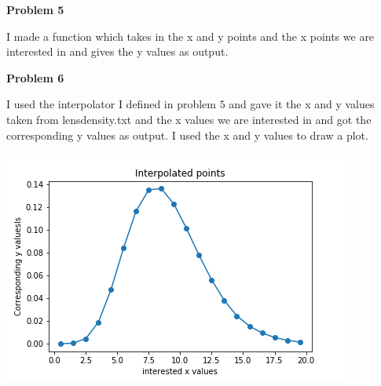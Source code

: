 \documentclass{article}
\begin{document}
\vspace{1.5em}

\textbf{Problem 5}\vspace{1.5em}

I made a function which takes in the x and y points and the x points we are interested in and gives the y values as output.
\vspace{1.5em}

\textbf{Problem 6}\vspace{1.5em}

I used the interpolator I defined in problem $5$ and gave it the x and y values taken from lensdensity.txt and the x values we are interested in and got the corresponding y values as output. I used the x and y values to draw a plot.  
\vspace{1.5em}
\begin{center}
 \includegraphics[scale=0.3]{Images/HW_1_pb6}
 \end{center}
 
\vspace{1.5em}
\end{document}
